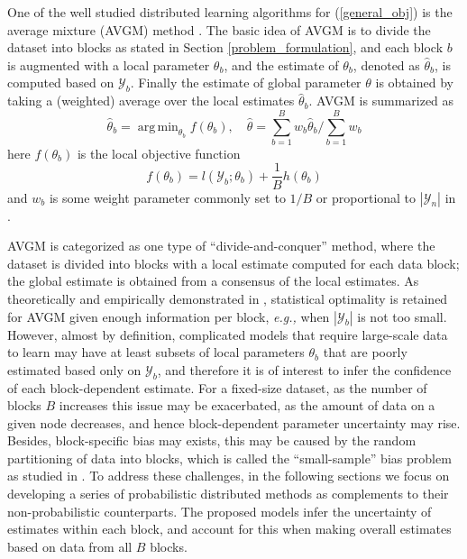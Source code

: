 \documentclass{article}
\DeclareMathOperator*{\argmin}{arg\,min}
\newcommand{\eg}[0]{\emph{e.g., }}
\newcommand{\1}[0]{\ensuremath{\boldsymbol{1}}\xspace}
\begin{document}
One of the well studied distributed learning algorithms for (\ref{general_obj}) is the average mixture (AVGM) method \cite{Mann2009, Zinkevich2010, YZhang2012}. The basic idea of AVGM is to divide the dataset into blocks as stated in Section \ref{problem_formulation}, and each block $b$ is augmented with a local parameter $\theta_b$, and the estimate of $\theta_b$, denoted as $\hat\theta_b$, is computed based on $\mathcal{Y}_b$. Finally the estimate of global parameter $\theta$ is obtained by taking a (weighted) average over the local estimates $\hat\theta_b$. AVGM is summarized as
\begin{equation}\label{avgm}
\hat\theta_b = \textstyle\argmin_{\theta_b}f(\theta_b), \quad \hat\theta = \textstyle\sum_{b=1}^B w_b\hat\theta_b/\sum_{b=1}^Bw_b
\end{equation} 
here $f(\theta_b)$ is the local objective function
\begin{equation}\label{avgm_local}
\textstyle f(\theta_b) = l(\mathcal{Y}_b; \theta_b)+\frac{1}{B}h(\theta_b)
\end{equation}
and $w_b$ is some weight parameter commonly set to $1/B$ \cite{Mann2009, Zinkevich2010} or proportional to $|\mathcal{Y}_n|$ in \cite{YZhang2012}. 


AVGM is categorized as one type of ``divide-and-conquer'' method, where the dataset is divided into blocks with a local estimate computed for each data block; the global estimate is obtained from a consensus of the local estimates. As theoretically and empirically demonstrated in \cite{YZhang2012}, statistical optimality is retained for AVGM given enough information per block, \eg when $|\mathcal{Y}_b|$ is not too small. However, almost by definition, complicated models that require large-scale data to learn may have at least subsets of local parameters $\theta_b$ that are poorly estimated based only on $\mathcal{Y}_b$, and therefore it is of interest to infer the confidence of each block-dependent estimate. For a fixed-size dataset, as the number of blocks $B$ increases this issue may be exacerbated, as the amount of data on a given node decreases, and hence block-dependent parameter uncertainty may rise. Besides, block-specific bias may exists, this may be caused by the random partitioning of data into blocks, which is called the ``small-sample'' bias problem as studied in \cite{YZhang2012, Scott2013}. To address these challenges, in the following sections we focus on developing a series of probabilistic distributed methods as complements to their non-probabilistic counterparts. The proposed models infer the uncertainty of estimates within each block, and account for this when making overall estimates based on data from all $B$ blocks.
\end{document}
